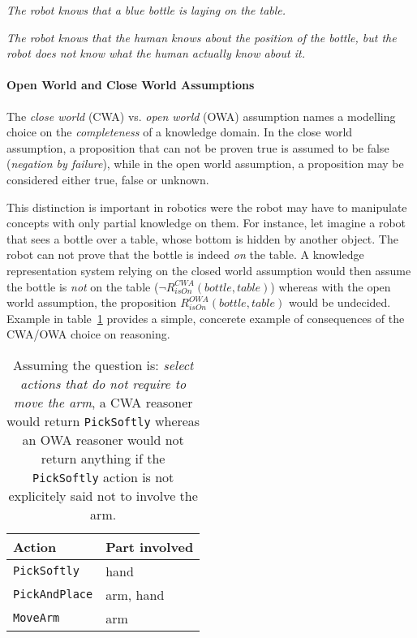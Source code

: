 \documentclass[a4paper, twocolumn]{article}
\begin{document}
\emph{The robot knows that a blue bottle is laying on the table.}

\emph{The robot knows that the human knows about the position of the bottle,
but the robot does not know what the human actually know about it.}

\paragraph{Open World and Close World Assumptions}

The \emph{close world} (CWA) vs. \emph{open world} (OWA) assumption names a
modelling choice on the \emph{completeness} of a knowledge domain. In the close
world assumption, a proposition that can not be proven true is assumed to be
false (\emph{negation by failure}), while in the open world assumption, a
proposition may be considered either true, false or unknown.

This distinction is important in robotics were the robot may have to manipulate
concepts with only partial knowledge on them. For instance, let imagine a robot
that sees a bottle over a table, whose bottom is hidden by another object. The
robot can not prove that the bottle is indeed \emph{on} the table. A knowledge
representation system relying on the closed world assumption would then assume
the bottle is \emph{not} on the table ($\lnot R^{CWA}_{isOn}(bottle, table)$)
whereas with the open world assumption, the proposition $R^{OWA}_{isOn}(bottle,
table)$ would be undecided. Example in table~\ref{table|cwa-owa-example} provides
a simple, concerete example of consequences of the CWA/OWA choice on reasoning.

\begin{table}
	\begin{center}
	\begin{tabular}{ll}
	{\bf Action} & {\bf Part involved} \\
	\hline
	{\tt PickSoftly} & hand \\
	{\tt PickAndPlace} & arm, hand \\
	{\tt MoveArm} & arm \\
	\hline
	\end{tabular}
	\end{center}
	\caption{Assuming the question is: \emph{select actions that do not require
	to move the arm}, a CWA reasoner would return {\tt PickSoftly} whereas an
	OWA reasoner would not return anything if the {\tt PickSoftly} action is
	not explicitely said not to involve the arm.}
	\label{table|cwa-owa-example}
\end{table}
\end{document}
